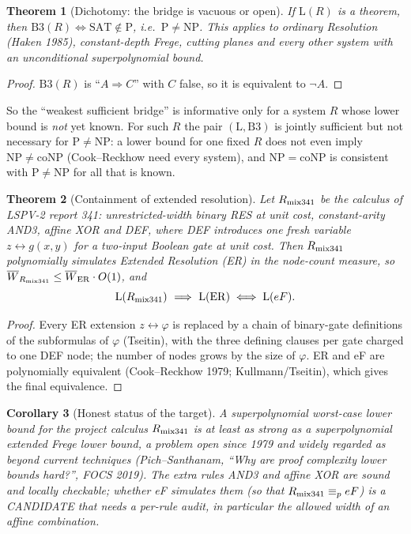 \documentclass[11pt]{article}
\newtheorem{theorem}{Theorem}
\newtheorem{corollary}[theorem]{Corollary}
\begin{document}
\begin{theorem}[Dichotomy: the bridge is vacuous or open]\label{t:dich}
If $\mathrm L(R)$ is a theorem, then $\mathrm{B3}(R)\iff \mathrm{SAT}\notin\mathrm P$, i.e.\ $\mathrm P\ne\mathrm{NP}$. This applies to ordinary Resolution (Haken 1985), constant-depth Frege, cutting planes and every other system with an unconditional superpolynomial bound.
\end{theorem}
\begin{proof} $\mathrm{B3}(R)$ is ``$A\Rightarrow C$'' with $C$ false, so it is equivalent to $\neg A$. \end{proof}
\noindent So the ``weakest sufficient bridge'' is informative only for a system $R$ whose lower bound is \emph{not} yet known. For such $R$ the pair $(\mathrm L,\mathrm{B3})$ is jointly sufficient but not necessary for $\mathrm P\ne\mathrm{NP}$: a lower bound for one fixed $R$ does not even imply $\mathrm{NP}\ne\mathrm{coNP}$ (Cook--Reckhow need every system), and $\mathrm{NP}=\mathrm{coNP}$ is consistent with $\mathrm P\ne\mathrm{NP}$ for all that is known.

\begin{theorem}[Containment of extended resolution]\label{t:er}
Let $R_{\rm mix341}$ be the calculus of LSPV-2 report 341: unrestricted-width binary RES at unit cost, constant-arity AND3, affine XOR and DEF, where DEF introduces one fresh variable $z\leftrightarrow g(x,y)$ for a two-input Boolean gate at unit cost. Then $R_{\rm mix341}$ polynomially simulates Extended Resolution (ER) in the node-count measure, so $\overline W_{R_{\rm mix341}}\le \overline W_{\rm ER}\cdot O(1)$, and
\[
\mathrm L(R_{\rm mix341})\ \Longrightarrow\ \mathrm L(\mathrm{ER})\iff \mathrm L(eF).
\]
\end{theorem}
\begin{proof} Every ER extension $z\leftrightarrow\varphi$ is replaced by a chain of binary-gate definitions of the subformulas of $\varphi$ (Tseitin), with the three defining clauses per gate charged to one DEF node; the number of nodes grows by the size of $\varphi$. ER and eF are polynomially equivalent (Cook--Reckhow 1979; Kullmann/Tseitin), which gives the final equivalence. \end{proof}

\begin{corollary}[Honest status of the target]
A superpolynomial worst-case lower bound for the project calculus $R_{\rm mix341}$ is at least as strong as a superpolynomial extended Frege lower bound, a problem open since 1979 and widely regarded as beyond current techniques (Pich--Santhanam, ``Why are proof complexity lower bounds hard?'', FOCS 2019). The extra rules AND3 and affine XOR are sound and locally checkable; whether eF simulates them (so that $R_{\rm mix341}\equiv_p eF$) is a CANDIDATE that needs a per-rule audit, in particular the allowed width of an affine combination.
\end{corollary}
\end{document}
